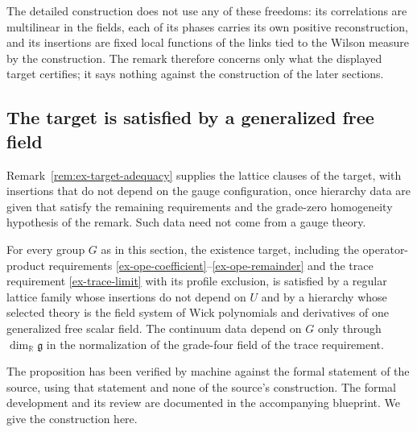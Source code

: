 \begin{remark}
The detailed construction does not use any of these freedoms: its
correlations are multilinear in the fields, each of its phases carries its
own positive reconstruction, and its insertions are fixed local functions of
the links tied to the Wilson measure by the construction. The remark
therefore concerns only what the displayed target certifies; it says nothing
against the construction of the later sections.
\end{remark}

\subsection{The target is satisfied by a generalized free field}
\label{ex-target-free-witness}

Remark~\ref{rem:ex-target-adequacy} supplies the lattice clauses of the
target, with insertions that do not depend on the gauge configuration, once
hierarchy data are given that satisfy the remaining requirements and the
grade-zero homogeneity hypothesis of the remark. Such data need not come from
a gauge theory.

\begin{proposition}
\label{prop:ex-target-free-witness}
For every group \(G\) as in this section, the existence target, including the
operator-product requirements
\eqref{ex-ope-coefficient}--\eqref{ex-ope-remainder} and the trace
requirement \eqref{ex-trace-limit} with its profile exclusion, is satisfied by
a regular lattice family whose insertions do not depend on \(U\) and by a
hierarchy whose selected theory is the field system of Wick polynomials and
derivatives of one generalized free scalar field. The continuum data depend
on \(G\) only through \(\dim_{\mathbb R}\mathfrak g\) in the normalization of
the grade-four field of the trace requirement.
\end{proposition}

The proposition has been verified by machine against the formal statement of
the source, using that statement and none of the source's construction. The
formal development and its review are documented in the accompanying
blueprint. We give the construction here.

